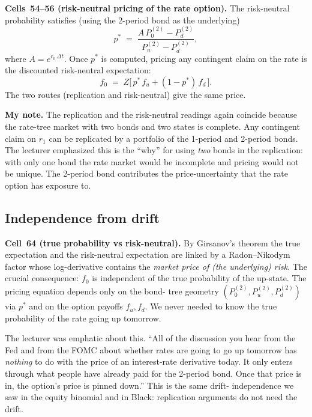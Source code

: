 \begin{keyblock}
\textbf{Cells~54--56 (risk-neutral pricing of the rate option).}
The risk-neutral probability satisfies (using the 2-period bond as
the underlying)
\[
  p^* \;=\;
    \frac{A\,P^{(2)}_0 - P^{(2)}_d}{P^{(2)}_u - P^{(2)}_d},
\]
where $A = e^{r_0\,\Delta t}$. Once $p^*$ is computed, pricing any
contingent claim on the rate is the discounted risk-neutral
expectation:
\[
  f_0 \;=\; Z\bigl[\,p^* \,f_u + (1 - p^*)\,f_d\,\bigr].
\]
The two routes (replication and risk-neutral) give the same price.
\end{keyblock}

\begin{checkpoint}
\textbf{My note.} The replication and the risk-neutral readings
again coincide because the rate-tree market with two bonds and two
states is complete. Any contingent claim on $r_1$ can be replicated
by a portfolio of the 1-period and 2-period bonds. The lecturer
emphasized this is the ``why'' for using \emph{two} bonds in the
replication: with only one bond the rate market would be incomplete
and pricing would not be unique. The 2-period bond contributes the
price-uncertainty that the rate option has exposure to.
\end{checkpoint}

\subsection{Independence from drift}\label{L8-sec:noDrift}

\begin{keyblock}
\textbf{Cell~64 (true probability vs risk-neutral).}
By Girsanov's theorem the true expectation and the risk-neutral
expectation are linked by a Radon--Nikodym factor whose log-derivative
contains the \emph{market price of (the underlying) risk}. The
crucial consequence: $f_0$ is independent of the true probability
of the up-state. The pricing equation depends only on the bond-
tree geometry $(P^{(2)}_0, P^{(2)}_u, P^{(2)}_d)$ via $p^*$ and on
the option payoffs $f_u, f_d$. We never needed to know the true
probability of the rate going up tomorrow.
\end{keyblock}

The lecturer was emphatic about this. ``All of the discussion you
hear from the Fed and from the FOMC about whether rates are going
to go up tomorrow has \emph{nothing} to do with the price of an
interest-rate derivative today. It only enters through what people
have already paid for the 2-period bond. Once that price is in,
the option's price is pinned down.'' This is the same drift-
independence we saw in the equity binomial and in Black: replication
arguments do not need the drift.

